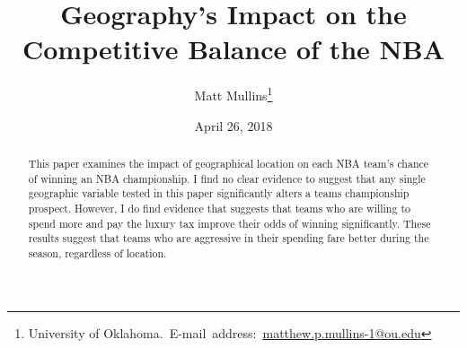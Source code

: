 \documentclass[12pt,english]{article}
\begin{document}
\begin{singlespace}
\title{Geography's Impact on the Competitive Balance of the NBA}

\end{singlespace}

\author{Matt Mullins\thanks{ University of Oklahoma.\
E-mail~address:~\href{mailto:student.matthew.p.mullins-1@ou.edu}{matthew.p.mullins-1@ou.edu}}}


\date{April 26, 2018}

\maketitle

\begin{abstract}
\begin{singlespace}
This paper examines the impact of geographical location on each NBA team's chance of winning an NBA championship. I find no clear evidence to suggest that any single geographic variable tested in this paper significantly alters a teams championship prospect. However, I do find evidence that suggests that teams who are willing to spend more and pay the luxury tax improve their odds of winning significantly. These results suggest that teams who are aggressive in their spending fare better during the season, regardless of location.  
\end{singlespace}

\end{abstract}
\vfill{}

\pagebreak{}
\end{document}
